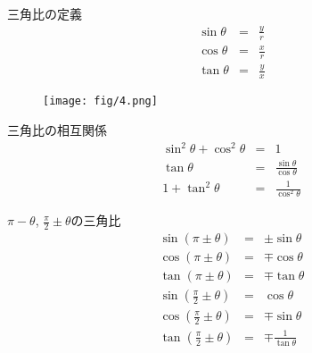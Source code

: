 \documentclass[aspectratio=169, 12pt]{beamer}
\begin{document}
\begin{frame}{三角比の定義}
    \begin{eqnarray*}
        \sin \theta &=&\frac{y}{r} \\
        \cos \theta &=&\frac{x}{r} \\
        \tan \theta &=&\frac{y}{x}
    \end{eqnarray*}
    \begin{figure}[htbp]
        \begin{center}
            \texttt{[image: fig/4.png]}
        \end{center}
    \end{figure}

\end{frame}
\begin{frame}{三角比の相互関係}
    \begin{eqnarray*}
        \sin^2\theta + \cos^2\theta &=&1 \\
        \tan\theta &=& \frac{\sin\theta}{\cos\theta} \\
        1+\tan^2\theta&=&\frac{1}{\cos^2\theta}
    \end{eqnarray*}
\end{frame}
\begin{frame}{$\pi-\theta$, $\frac{\pi}{2}\pm \theta$の三角比}
    \begin{eqnarray*}
        \sin(\pi\pm\theta)&=&\pm\sin\theta \\
        \cos(\pi\pm\theta)&=&\mp\cos\theta \\
        \tan(\pi\pm\theta)&=&\mp\tan\theta \\
        \sin(\frac{\pi}{2}\pm\theta)&=&\cos\theta \\
        \cos(\frac{\pi}{2}\pm\theta)&=&\mp\sin\theta \\
        \tan(\frac{\pi}{2}\pm\theta)&=&\mp\frac{1}{\tan\theta} \\
    \end{eqnarray*}
\end{frame}
\end{document}
